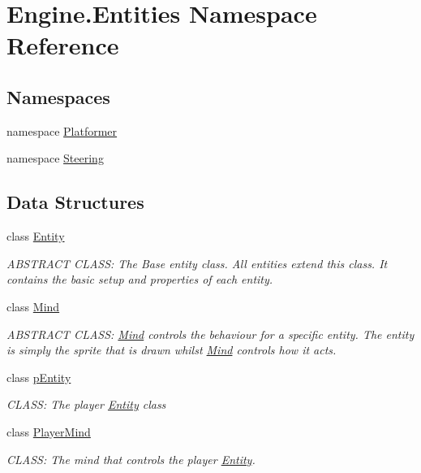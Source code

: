 \hypertarget{a00242}{}\section{Engine.\+Entities Namespace Reference}
\label{a00242}
\subsection*{Namespaces}
\begin{DoxyCompactItemize}
\item 
namespace \hyperlink{a00243}{Platformer}
\item 
namespace \hyperlink{a00244}{Steering}
\end{DoxyCompactItemize}
\subsection*{Data Structures}
\begin{DoxyCompactItemize}
\item 
class \hyperlink{a00314}{Entity}
\begin{DoxyCompactList}\small\item\em A\+B\+S\+T\+R\+A\+CT C\+L\+A\+SS\+: The Base entity class. All entities extend this class. It contains the basic setup and properties of each entity. \end{DoxyCompactList}\item 
class \hyperlink{a00318}{Mind}
\begin{DoxyCompactList}\small\item\em A\+B\+S\+T\+R\+A\+CT C\+L\+A\+SS\+: \hyperlink{a00318}{Mind} controls the behaviour for a specific entity. The entity is simply the sprite that is drawn whilst \hyperlink{a00318}{Mind} controls how it acts. \end{DoxyCompactList}\item 
class \hyperlink{a00322}{p\+Entity}
\begin{DoxyCompactList}\small\item\em C\+L\+A\+SS\+: The player \hyperlink{a00314}{Entity} class \end{DoxyCompactList}\item 
class \hyperlink{a00326}{Player\+Mind}
\begin{DoxyCompactList}\small\item\em C\+L\+A\+SS\+: The mind that controls the player \hyperlink{a00314}{Entity}. \end{DoxyCompactList}\end{DoxyCompactItemize}
